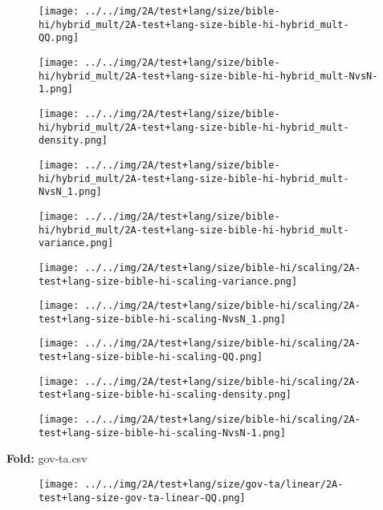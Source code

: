 \begin{figure}[H]
\centering	\texttt{[image: ../../img/2A/test+lang/size/bible-hi/hybrid\_mult/2A-test+lang-size-bible-hi-hybrid\_mult-QQ.png]}
\end{figure}
\begin{figure}[H]
\centering	\texttt{[image: ../../img/2A/test+lang/size/bible-hi/hybrid\_mult/2A-test+lang-size-bible-hi-hybrid\_mult-NvsN-1.png]}
\end{figure}
\begin{figure}[H]
\centering	\texttt{[image: ../../img/2A/test+lang/size/bible-hi/hybrid\_mult/2A-test+lang-size-bible-hi-hybrid\_mult-density.png]}
\end{figure}
\begin{figure}[H]
\centering	\texttt{[image: ../../img/2A/test+lang/size/bible-hi/hybrid\_mult/2A-test+lang-size-bible-hi-hybrid\_mult-NvsN\_1.png]}
\end{figure}
\begin{figure}[H]
\centering	\texttt{[image: ../../img/2A/test+lang/size/bible-hi/hybrid\_mult/2A-test+lang-size-bible-hi-hybrid\_mult-variance.png]}
\end{figure}
\begin{figure}[H]
\centering	\texttt{[image: ../../img/2A/test+lang/size/bible-hi/scaling/2A-test+lang-size-bible-hi-scaling-variance.png]}
\end{figure}
\begin{figure}[H]
\centering	\texttt{[image: ../../img/2A/test+lang/size/bible-hi/scaling/2A-test+lang-size-bible-hi-scaling-NvsN\_1.png]}
\end{figure}
\begin{figure}[H]
\centering	\texttt{[image: ../../img/2A/test+lang/size/bible-hi/scaling/2A-test+lang-size-bible-hi-scaling-QQ.png]}
\end{figure}
\begin{figure}[H]
\centering	\texttt{[image: ../../img/2A/test+lang/size/bible-hi/scaling/2A-test+lang-size-bible-hi-scaling-density.png]}
\end{figure}
\begin{figure}[H]
\centering	\texttt{[image: ../../img/2A/test+lang/size/bible-hi/scaling/2A-test+lang-size-bible-hi-scaling-NvsN-1.png]}
\end{figure}
\textbf{Fold:} gov-ta.csv
\begin{figure}[H]
\centering	\texttt{[image: ../../img/2A/test+lang/size/gov-ta/linear/2A-test+lang-size-gov-ta-linear-QQ.png]}
\end{figure}
